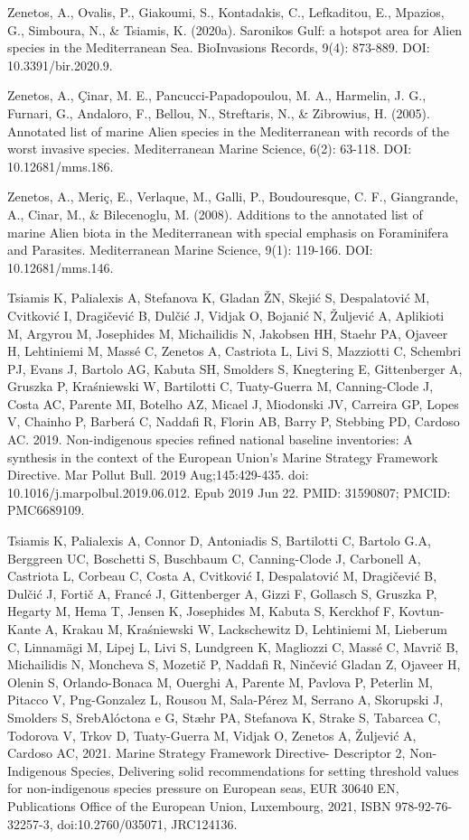 \documentclass{article}
\begin{document}
\begin{thebibliography}{18}
Zenetos, A., Ovalis, P., Giakoumi, S., Kontadakis, C., Lefkaditou, E., Mpazios, G., Simboura, N., \& Tsiamis, K. (2020a). Saronikos Gulf: a hotspot area for Alien species in the Mediterranean Sea. BioInvasions Records, 9(4): 873-889. DOI: 10.3391/bir.2020.9.

Zenetos, A., Çinar, M. E., Pancucci-Papadopoulou, M. A., Harmelin, J. G., Furnari, G., Andaloro, F., Bellou, N., Streftaris, N., \& Zibrowius, H. (2005). Annotated list of marine Alien species in the Mediterranean with records of the worst invasive species. Mediterranean Marine Science, 6(2): 63-118. DOI: 10.12681/mms.186.

Zenetos, A., Meriç, E., Verlaque, M., Galli, P., Boudouresque, C. F., Giangrande, A., Cinar, M., \& Bilecenoglu, M. (2008). Additions to the annotated list of marine Alien biota in the Mediterranean with special emphasis on Foraminifera and Parasites. Mediterranean Marine Science, 9(1): 119-166. DOI: 10.12681/mms.146.

Tsiamis K, Palialexis A, Stefanova K, Gladan ŽN, Skejić S, Despalatović M, Cvitković I, Dragičević B, Dulčić J, Vidjak O, Bojanić N, Žuljević A, Aplikioti M, Argyrou M, Josephides M, Michailidis N, Jakobsen HH, Staehr PA, Ojaveer H, Lehtiniemi M, Massé C, Zenetos A, Castriota L, Livi S, Mazziotti C, Schembri PJ, Evans J, Bartolo AG, Kabuta SH, Smolders S, Knegtering E, Gittenberger A, Gruszka P, Kraśniewski W, Bartilotti C, Tuaty-Guerra M, Canning-Clode J, Costa AC, Parente MI, Botelho AZ, Micael J, Miodonski JV, Carreira GP, Lopes V, Chainho P, Barberá C, Naddafi R, Florin AB, Barry P, Stebbing PD, Cardoso AC. 2019. Non-indigenous species refined national baseline inventories: A synthesis in the context of the European Union's Marine Strategy Framework Directive. Mar Pollut Bull. 2019 Aug;145:429-435. doi: 10.1016/j.marpolbul.2019.06.012. Epub 2019 Jun 22. PMID: 31590807; PMCID: PMC6689109.

Tsiamis K, Palialexis A, Connor D, Antoniadis S, Bartilotti C, Bartolo G.A, Berggreen UC, Boschetti S, Buschbaum C, Canning-Clode J, Carbonell A, Castriota L, Corbeau C, Costa A, Cvitković I, Despalatović M, Dragičević B, Dulčić J, Fortič A, Francé J, Gittenberger A, Gizzi F, Gollasch S, Gruszka P, Hegarty M, Hema T, Jensen K, Josephides M, Kabuta S, Kerckhof F, Kovtun-Kante A, Krakau M, Kraśniewski W, Lackschewitz D, Lehtiniemi M, Lieberum C, Linnamägi M, Lipej L, Livi S, Lundgreen K, Magliozzi C, Massé C, Mavrič B, Michailidis N, Moncheva S, Mozetič P, Naddafi R, Ninčević Gladan Z, Ojaveer H, Olenin S, Orlando-Bonaca M, Ouerghi A, Parente M, Pavlova P, Peterlin M, Pitacco V, Png-Gonzalez L, Rousou M, Sala-Pérez M, Serrano A, Skorupski J, Smolders S, SrebAlóctona e G, Stæhr PA, Stefanova K, Strake S, Tabarcea C, Todorova V, Trkov D, Tuaty-Guerra M, Vidjak O, Zenetos A, Žuljević A, Cardoso AC, 2021. Marine Strategy Framework Directive- Descriptor 2, Non-Indigenous Species, Delivering solid recommendations for setting threshold values for non-indigenous species pressure on European seas, EUR 30640 EN, Publications Office of the European Union, Luxembourg, 2021, ISBN 978-92-76-32257-3, doi:10.2760/035071, JRC124136.


\end{thebibliography}
\end{document}
